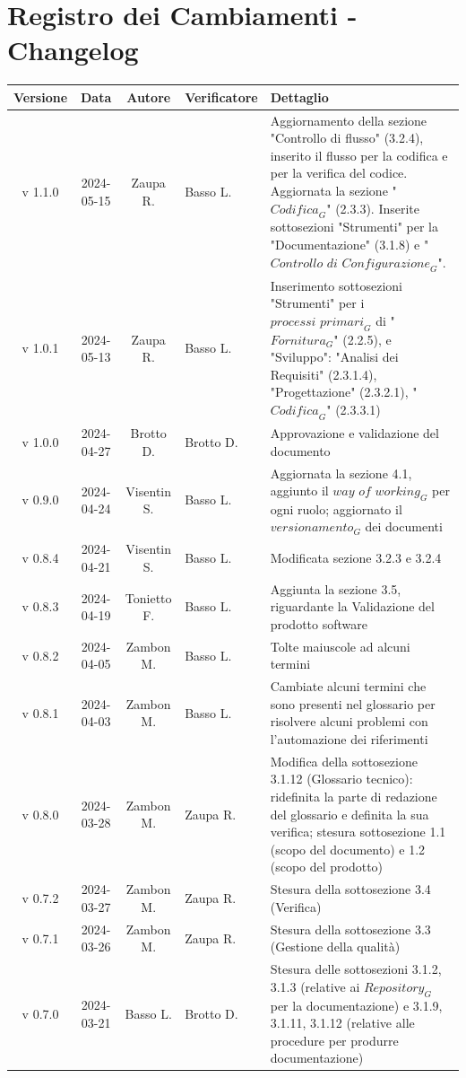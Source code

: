 \documentclass[12pt, oneside]{article}
\begin{document}
\section*{Registro dei Cambiamenti - Changelog}
\begin{longtable}{|c|c|c|p{3cm}|p{7cm}|}
\hline
\textbf{Versione} & \textbf{Data} & \textbf{Autore} & \textbf{Verificatore} & \textbf{Dettaglio} \\
\hline
v 1.1.0 & 2024-05-15 & Zaupa R. & Basso L. & Aggiornamento della sezione "Controllo di flusso" (3.2.4), inserito il flusso per la codifica e per la verifica del codice. Aggiornata la sezione "$\textit{Codifica}_G$" (2.3.3). Inserite sottosezioni "Strumenti" per la "Documentazione" (3.1.8) e "$\textit{Controllo di Configurazione}_G$".\\
\hline
v 1.0.1 & 2024-05-13 & Zaupa R. & Basso L. & Inserimento sottosezioni "Strumenti" per i $\textit{processi primari}_G$ di "$\textit{Fornitura}_G$" (2.2.5), e "Sviluppo": "Analisi dei Requisiti" (2.3.1.4), "Progettazione" (2.3.2.1), "$\textit{Codifica}_G$" (2.3.3.1) \\
\hline
v 1.0.0 & 2024-04-27 & Brotto D. & Brotto D. & Approvazione e validazione del documento \\
\hline
v 0.9.0 & 2024-04-24 & Visentin S. & Basso L. & Aggiornata la sezione 4.1, aggiunto il $\textit{way of working}_G$ per ogni ruolo; aggiornato il $\textit{versionamento}_G$ dei documenti \\
\hline
v 0.8.4 & 2024-04-21 & Visentin S. & Basso L. & Modificata sezione 3.2.3 e 3.2.4 \\
\hline
v 0.8.3 & 2024-04-19 & Tonietto F. & Basso L. & Aggiunta la sezione 3.5, riguardante la Validazione del prodotto software\\
\hline
v 0.8.2 & 2024-04-05 & Zambon M. & Basso L. & Tolte maiuscole ad alcuni termini\\
\hline
v 0.8.1 & 2024-04-03 & Zambon M. & Basso L. & Cambiate alcuni termini che sono presenti nel glossario per risolvere alcuni problemi con l'automazione dei riferimenti\\
\hline
v 0.8.0 & 2024-03-28 & Zambon M. & Zaupa R. & Modifica della sottosezione 3.1.12 (Glossario tecnico): ridefinita la parte di redazione del glossario e definita la sua verifica; stesura sottosezione 1.1 (scopo del documento) e 1.2 (scopo del prodotto)\\
\hline
v 0.7.2 & 2024-03-27 & Zambon M. & Zaupa R. & Stesura della sottosezione 3.4 (Verifica)\\
\hline
v 0.7.1 & 2024-03-26 & Zambon M. & Zaupa R. & Stesura della sottosezione 3.3 (Gestione della qualità)\\
\hline
v 0.7.0 & 2024-03-21 & Basso L. & Brotto D. & Stesura delle sottosezioni 3.1.2, 3.1.3 (relative ai $\textit{Repository}_G$ per la documentazione) e 3.1.9, 3.1.11, 3.1.12 (relative alle procedure per produrre documentazione)\\
\hline


\end{longtable}
\end{document}
